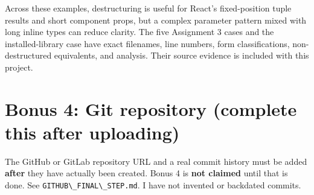 \documentclass[
  9pt,
]{article}
\newcommand{\passthrough}[1]{#1}
\begin{document}
Across these examples, destructuring is useful for React's
fixed-position tuple results and short component props, but a complex
parameter pattern mixed with long inline types can reduce clarity. The
five Assignment 3 cases and the installed-library case have exact
filenames, line numbers, form classifications, non-destructured
equivalents, and analysis. Their source evidence is included with this
project.

\section{Bonus 4: Git repository (complete this after
uploading)}\label{bonus-4-git-repository-complete-this-after-uploading}

The GitHub or GitLab repository URL and a real commit history must be
added \textbf{after} they have actually been created. Bonus 4 is
\textbf{not claimed} until that is done. See
\passthrough{\lstinline!GITHUB\_FINAL\_STEP.md!}. I have not invented or
backdated commits.
\end{document}
